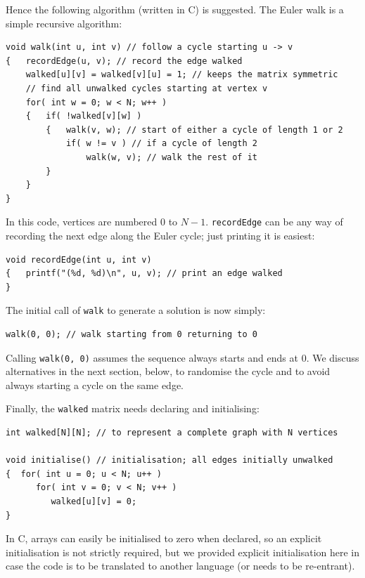 \documentclass[12pt]{article}
\begin{document}
Hence the following algorithm (written in C) is suggested.  The Euler walk is a simple recursive algorithm:
 
\begin{Verbatim}
void walk(int u, int v) // follow a cycle starting u -> v
{   recordEdge(u, v); // record the edge walked
    walked[u][v] = walked[v][u] = 1; // keeps the matrix symmetric
    // find all unwalked cycles starting at vertex v
    for( int w = 0; w < N; w++ )
    {   if( !walked[v][w] )
        {   walk(v, w); // start of either a cycle of length 1 or 2
            if( w != v ) // if a cycle of length 2
                walk(w, v); // walk the rest of it
        } 
    }
}
\end{Verbatim}

In this code, vertices are numbered $0$ to $N-1$. \texttt{recordEdge} can be any way of recording the next edge along the Euler cycle; just printing it is easiest:

\begin{Verbatim}
void recordEdge(int u, int v) 
{   printf("(%d, %d)\n", u, v); // print an edge walked
}
\end{Verbatim}

The initial call of \texttt{walk} to generate a solution is now simply:  

\begin{Verbatim}      
walk(0, 0); // walk starting from 0 returning to 0
\end{Verbatim}

Calling \texttt{walk(0, 0)} assumes the sequence always starts and ends at 0. We discuss alternatives in the next section, below, to randomise the cycle and to avoid always starting a cycle on the same edge.

Finally, the \texttt{walked} matrix needs declaring and initialising: 

\begin{Verbatim}
int walked[N][N]; // to represent a complete graph with N vertices

void initialise() // initialisation; all edges initially unwalked
{  for( int u = 0; u < N; u++ )
      for( int v = 0; v < N; v++ )
         walked[u][v] = 0; 
}
\end{Verbatim}

In C, arrays can easily be initialised to zero when declared, so an explicit initialisation is not strictly required, but we provided explicit initialisation here in case the code is to be translated to another language (or needs to be re-entrant). 
\end{document}

